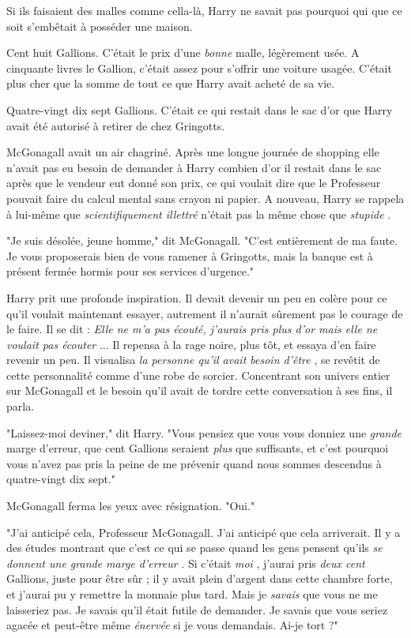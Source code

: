 Si ils faisaient des malles comme cella-là, Harry ne savait pas pourquoi qui que ce soit s'embêtait à posséder une maison.

Cent huit Gallions. C'était le prix d'une \emph{bonne}  malle, légèrement usée. A cinquante livres le Gallion, c'était assez pour s'offrir une voiture usagée. C'était plus cher que la somme de tout ce que Harry avait acheté de sa vie.

Quatre-vingt dix sept Gallions. C'était ce qui restait dans le sac d'or que Harry avait été autorisé à retirer de chez Gringotts.

McGonagall avait un air chagriné. Après une longue journée de shopping elle n'avait pas eu besoin de demander à Harry combien d'or il restait dans le sac après que le vendeur eut donné son prix, ce qui voulait dire que le Professeur pouvait faire du calcul mental sans crayon ni papier. A nouveau, Harry se rappela à lui-même que \emph{scientifiquement illettré}  n'était pas la même chose que \emph{stupide} .

"Je suis désolée, jeune homme," dit McGonagall. "C'est entièrement de ma faute. Je vous proposerais bien de vous ramener à Gringotts, mais la banque est à présent fermée hormis pour ses services d'urgence."

Harry prit une profonde inspiration. Il devait devenir un peu en colère pour ce qu'il voulait maintenant essayer, autrement il n'aurait sûrement pas le courage de le faire. Il se dit : \emph{Elle ne m'a pas écouté, j'aurais pris plus d'or mais elle ne voulait pas écouter} ... Il repensa à la rage noire, plus tôt, et essaya d'en faire revenir un peu. Il visualisa \emph{la personne qu'il avait besoin d'être} , se revêtit de cette personnalité comme d'une robe de sorcier. Concentrant son univers entier sur McGonagall et le besoin qu'il avait de tordre cette conversation à ses fins, il parla.

"Laissez-moi deviner," dit Harry. "Vous pensiez que vous vous donniez une \emph{grande}  marge d'erreur, que cent Gallions seraient \emph{plus}  que suffisants, et c'est pourquoi vous n'avez pas pris la peine de me prévenir quand nous sommes descendus à quatre-vingt dix sept."

McGonagall ferma les yeux avec résignation. "Oui."

"J'ai anticipé cela, Professeur McGonagall. J'ai anticipé que cela arriverait. Il y a des études montrant que c'est ce qui se passe quand les gens pensent qu'ils \emph{se donnent une grande marge d'erreur} . Si c'était \emph{moi} , j'aurai pris \emph{deux cent}  Gallions, juste pour être sûr ; il y avait plein d'argent dans cette chambre forte, et j'aurai pu y remettre la monnaie plus tard. Mais je \emph{savais}  que vous ne me laisseriez pas. Je savais qu'il était futile de demander. Je savais que vous seriez agacée et peut-être même \emph{énervée}  si je vous demandais. Ai-je tort ?"

